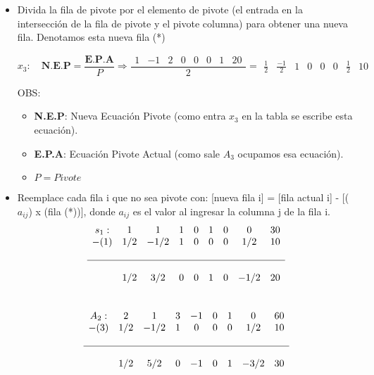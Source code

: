 \documentclass{templateNote}
\begin{document}
\begin{itemize}
    \item Divida la fila de pivote por el elemento de pivote (el entrada en la intersección de la fila de pivote y el pivote columna) para obtener una nueva fila. Denotamos esta nueva fila (*)
    \begin{center}
        \begin{equation*}
        x_3: \quad \textbf{N.E.P} = \frac{\textbf{E.P.A}}{P} \Rightarrow \frac{\begin{array}{cccccccc} 1 & -1 & 2 & 0 & 0 & 0 & 1 & 20\end{array}}{2} = \begin{array}{cccccccc} \frac{1}{2} & \frac{-1}{2} & 1 & 0 & 0 & 0 & \frac{1}{2} & 10 \end{array}
        \end{equation*}
    \end{center}
        OBS:
        \begin{itemize}
            \item \textbf{N.E.P}: Nueva Ecuación Pivote (como entra $x_3$ en la tabla se escribe esta ecuación).
            \item \textbf{E.P.A}: Ecuación Pivote Actual (como sale $A_3$ ocupamos esa ecuación).
            \item $P = Pivote$
        \end{itemize}
    \item Reemplace cada fila i que no sea pivote con: [nueva fila i] = [fila actual i] - [($a_{ij}$) x (fila (*))], donde  $a_{ij}$ es el valor al ingresar la columna j de la fila i.
    \begin{equation*}
        \begin{array}{cccccccccc}
            s_1: & 1 & 1 & 1 & 0 & 1 & 0 & 0 & 30 \\
            -(1) & 1/2 & -1/2 & 1 & 0 & 0 & 0 & 1/2 & 10 \\
            \\ \hline \\
            & 1/2 & 3/2 & 0 & 0 & 1 & 0 & -1/2 & 20
        \end{array}
    \end{equation*}
    \\
    \begin{equation*}
        \begin{array}{ccccccccc}
            A_2: & 2 & 1 & 3 & -1 & 0 & 1 & 0 & 60 \\
            -(3) & 1/2 & -1/2 & 1 & 0 & 0 & 0 & 1/2 & 10 \\
            \\ \hline \\
            & 1/2 & 5/2 & 0 & -1 & 0 & 1 & -3/2 & 30
        \end{array}
    \end{equation*}
\end{itemize}
\end{document}
